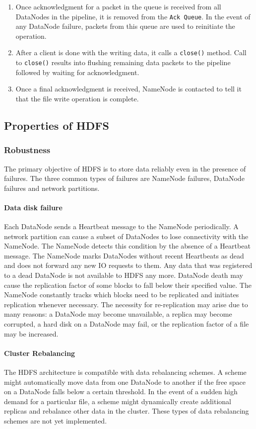 \documentclass{article}
\begin{document}
\begin{enumerate}
    \item Once acknowledgment for a packet in the queue is received from all DataNodes in the pipeline, it is removed from the \texttt{Ack Queue}. In the event of any DataNode failure, packets from this queue are used to reinitiate the operation.
    \item After a client is done with the writing data, it calls a \verb|close()| method. Call to \verb|close()| results into flushing remaining data packets to the pipeline followed by waiting for acknowledgment.
    \item Once a final acknowledgment is received, NameNode is contacted to tell it that the file write operation is complete.
\end{enumerate}

\subsection{Properties of HDFS}

\subsubsection{Robustness}
The primary objective of HDFS is to store data reliably even in the presence of failures. The three common types of failures are NameNode failures, DataNode failures and network partitions.

\paragraph{Data disk failure} Each DataNode sends a Heartbeat message to the NameNode periodically. A network partition can cause a subset of DataNodes to lose connectivity with the NameNode. The NameNode detects this condition by the absence of a Heartbeat message. The NameNode marks DataNodes without recent Heartbeats as dead and does not forward any new IO requests to them. Any data that was registered to a dead DataNode is not available to HDFS any more. DataNode death may cause the replication factor of some blocks to fall below their specified value. The NameNode constantly tracks which blocks need to be replicated and initiates replication whenever necessary. The necessity for re-replication may arise due to many reasons: a DataNode may become unavailable, a replica may become corrupted, a hard disk on a DataNode may fail, or the replication factor of a file may be increased.

\paragraph{Cluster Rebalancing} The HDFS architecture is compatible with data rebalancing schemes. A scheme might automatically move data from one DataNode to another if the free space on a DataNode falls below a certain threshold. In the event of a sudden high demand for a particular file, a scheme might dynamically create additional replicas and rebalance other data in the cluster. These types of data rebalancing schemes are not yet implemented.
\end{document}

